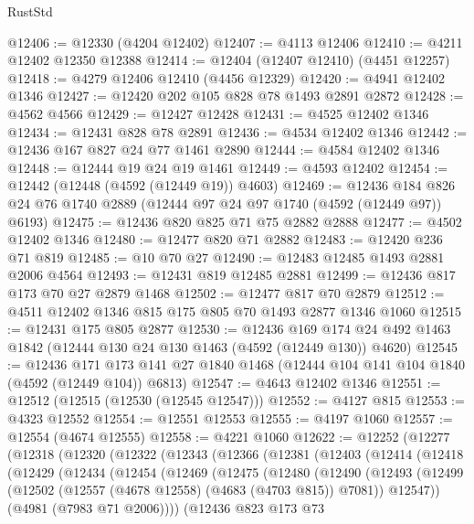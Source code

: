 \begin{lexlean}{RustStd}
\begin{coremodule}
@12406 := @12330 (@4204 @12402)
@12407 := @4113 @12406
@12410 := @4211 @12402 @12350 @12388
@12414 := @12404 (@12407 @12410) (@4451 @12257)
@12418 := @4279 @12406 @12410 (@4456 @12329)
@12420 := @4941 @12402 @1346
@12427 := @12420 @202 @105 @828 @78 @1493 @2891 @2872
@12428 := @4562 @4566
@12429 := @12427 @12428
@12431 := @4525 @12402 @1346
@12434 := @12431 @828 @78 @2891
@12436 := @4534 @12402 @1346
@12442 := @12436 @167 @827 @24 @77 @1461 @2890
@12444 := @4584 @12402 @1346
@12448 := @12444 @19 @24 @19 @1461
@12449 := @4593 @12402
@12454 := @12442 (@12448 (@4592 (@12449 @19)) @4603)
@12469 := @12436 @184 @826 @24 @76 @1740 @2889 (@12444 @97 @24 @97 @1740 (@4592 (@12449 @97)) @6193)
@12475 := @12436 @820 @825 @71 @75 @2882 @2888
@12477 := @4502 @12402 @1346
@12480 := @12477 @820 @71 @2882
@12483 := @12420 @236 @71 @819
@12485 := @10 @70 @27
@12490 := @12483 @12485 @1493 @2881 @2006 @4564
@12493 := @12431 @819 @12485 @2881
@12499 := @12436 @817 @173 @70 @27 @2879 @1468
@12502 := @12477 @817 @70 @2879
@12512 := @4511 @12402 @1346 @815 @175 @805 @70 @1493 @2877 @1346 @1060
@12515 := @12431 @175 @805 @2877
@12530 := @12436
    @169
    @174
    @24
    @492
    @1463
    @1842
    (@12444 @130 @24 @130 @1463 (@4592 (@12449 @130)) @4620)
@12545 := @12436
    @171
    @173
    @141
    @27
    @1840
    @1468
    (@12444 @104 @141 @104 @1840 (@4592 (@12449 @104)) @6813)
@12547 := @4643 @12402 @1346
@12551 := @12512 (@12515 (@12530 (@12545 @12547)))
@12552 := @4127 @815
@12553 := @4323 @12552
@12554 := @12551 @12553
@12555 := @4197 @1060
@12557 := @12554 (@4674 @12555)
@12558 := @4221 @1060
@12622 := @12252
    (@12277
      (@12318
        (@12320
          (@12322
            (@12343
              (@12366
                (@12381
                  (@12403
                    (@12414
                      (@12418
                        (@12429
                          (@12434
                            (@12454
                              (@12469
                                (@12475
                                  (@12480
                                    (@12490
                                      (@12493
                                        (@12499
                                          (@12502
                                            (@12557 (@4678 @12558) (@4683 (@4703 @815)) @7081))
                                          @12547))
                                      (@4981 (@7983 @71 @2006))))
                                  (@12436
                                    @823
                                    @173
                                    @73

\end{coremodule}
\end{lexlean}
